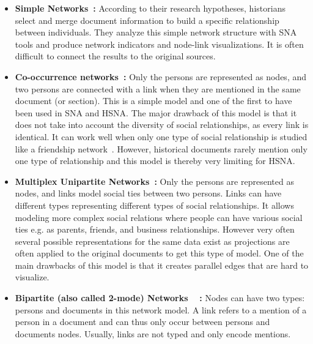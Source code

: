 \begin{itemize}[nosep,leftmargin=*]
    \item \textbf{Simple Networks~\cite{wetherellHistoricalSocialNetwork1998}:} According to their research hypotheses, historians select and merge document information to build a specific relationship between individuals. They analyze this simple network structure with SNA tools and produce network indicators and node-link visualizations. It is often difficult to connect the results to the original sources.
    \item \textbf{Co-occurrence networks~\cite{sairioMethodologicalPracticalAspects2009}:}
    Only the persons are represented as nodes, and two persons are connected with a link when they are mentioned in the same document (or section).
    This is a simple model and one of the first to have been used in SNA and HSNA. The major drawback of this model is that it does not take into account the diversity of social relationships, as every link is identical. It can work well when only one type of social relationship is studied like a friendship network~\cite{morenoFoundationsSociometryIntroduction1941}. However, historical documents rarely mention only one type of relationship and this model is thereby very limiting for HSNA.
    \item \textbf{Multiplex Unipartite Networks~\cite{eriksonMalfeasanceFoundationsGlobal2006}:} Only the persons are represented as nodes, and links model social ties between two persons. Links can have different types representing different types of social relationships. It allows modeling more complex social relations where people can have various social ties e.g. as parents, friends, and business relationships. However very often several possible representations for the same data exist as projections are often applied to the original documents to get this type of model. One of the main drawbacks of this model is that it creates parallel edges that are hard to visualize.
    \item \textbf{Bipartite (also called 2-mode) Networks
    ~\cite{hambergerScanningPatternsRelationship2014}
    :} Nodes can have two types: persons and documents in this network model. A link refers to a mention of a person in a document and can thus only occur between persons and documents nodes. Usually, links are not typed and only encode mentions.

\end{itemize}
